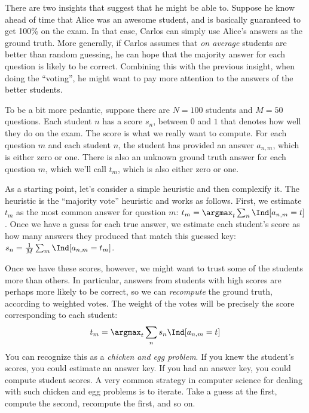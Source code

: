 There are two insights that suggest that he might be able to.
Suppose he know ahead of time that Alice was an awesome student, and is basically guaranteed to get 100\% on the exam.
In that case, Carlos can simply use Alice's answers as the ground truth.
More generally, if Carlos assumes that \emph{on average} students are better than random guessing, he can hope that the majority answer for each question is likely to be correct.
Combining this with the previous insight, when doing the ``voting'', he might want to pay more attention to the answers of the better students.

To be a bit more pedantic, suppose there are $N=100$ students and $M=50$ questions.
Each student $n$ has a score $s_n$, between $0$ and $1$ that denotes how well they do on the exam.
The score is what we really want to compute.
For each question $m$ and each student $n$, the student has provided an answer $a_{n,m}$, which is either zero or one.
There is also an unknown ground truth answer for each question $m$, which we'll call $t_m$, which is also either zero or one.

As a starting point, let's consider a simple heuristic and then complexify it.
The heuristic is the ``majority vote'' heuristic and works as follows.
First, we estimate $t_m$ as the most common answer for question $m$:
$t_m = \argmax_t \sum_n \Ind[a_{n,m} = t]$.
Once we have a guess for each true answer, we estimate each student's score as how many answers they produced that match this guessed key:
$s_n = \frac 1 M \sum_m \Ind[a_{n,m} = t_m]$.

Once we have these scores, however, we might want to trust some of the students more than others.
In particular, answers from students with high scores are perhaps more likely to be correct, so we can \emph{recompute} the ground truth, according to weighted votes.
The weight of the votes will be precisely the score corresponding to each student:
%
\begin{align}
  t_m = \argmax_t \sum_n s_n \Ind[a_{n,m} = t]
\end{align}
%
You can recognize this as a \emph{chicken and egg problem}. If you knew the student's scores, you could estimate an answer key. If you had an answer key, you could compute student scores.
A very common strategy in computer science for dealing with such chicken and egg problems is to iterate.
Take a guess at the first, compute the second, recompute the first, and so on.

